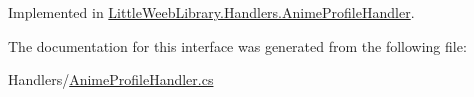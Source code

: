 Implemented in \mbox{\hyperlink{class_little_weeb_library_1_1_handlers_1_1_anime_profile_handler_a7469a40799e1067d871ba87679f54c37}{Little\+Weeb\+Library.\+Handlers.\+Anime\+Profile\+Handler}}.



The documentation for this interface was generated from the following file\+:\begin{DoxyCompactItemize}
\item 
Handlers/\mbox{\hyperlink{_anime_profile_handler_8cs}{Anime\+Profile\+Handler.\+cs}}\end{DoxyCompactItemize}
